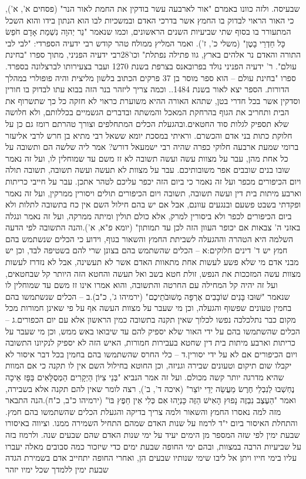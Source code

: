 \documentclass[12pt, openany]{book}
\begin{document}
שבעיסה. ולזה כוונו באמרם "אור לארבעה עשר בודקין את החמת לאור הנר" (פסחים א', א'), כי האור הראוי לבדוק בו החמץ אשר בדרכי האדם ובמשכיות לבו הוא הנתון בידו והוא השכל המתעורר בו בסוף שתי שביעיות השנים הראשונים, וכמו שנאמר "נֵר יְהוָה נִשְׁמַת אָדָם חֹפֵשׂ כָּל חַדְרֵי בָטֶן" (משלי כ', ז'). ואמר המליץ ממולח טהר קודש רבי ידעיה הספרדי: "לבי לבי  התורה והאדם נר אלהים בארץ, גוו פתילה נפתלת" וכו'28רבי ידעיה הפניני, מתוך ספרו "בחינת עולם". ר' ידעיה הפניני נולד בפרובאנס בצרפת בשנת 1270 ועבר בצעירותו לברצלונה בספרד. ספרו "בחינת עולם – הוא ספר מוסר בן 37 פרקים הכתוב בלשון מליצית והיה פופולרי במהלך הדורות. הספר יצא לאור בשנת 1484.. וכמה צריך ליזהר בנר הזה בבוא עתו לבדוק בו חורין וסדקין אשר בכל חדרי בטן, שתהא האורה ההיא משוערת כראוי לא חזקה כל כך שתשרוף את הבית ותחריב את הגוף בהרחקת המאכל והמשתה ובדברים הגשמיים בכללותם, ולא חלושה שלא תספיק לגלות סוד החטאים.ובהגעלת הכלים המתחלפים וצורך טהרתם רומז גם כן  על חלוקת כתות בני אדם והכשרם. וראיתי במסכת יומא ששאל רבי מתיא בן חרש לרבי אליעזר ברומי שמעת ארבעה חלוקי כפרה שהיה רבי ישמעאל דורש? אמר ליה שלשה הם ותשובה על כל אחת מהן, עבר על מצוות עשה ועשה תשובה לא זז משם עד שמוחלין לו, ועל זה נאמר שובו בנים שובבים אפר משובותיכם. עבר על מצוות לא תעשה ועשה תשובה, תשובה תולה ויום הכיפורים מכפר ועל זה נאמר כי ביום הזה יכפר עליכם לטהר אתכן. עבר על חייבי כריתות וארבע מיתות בית דין ועשה תשובה, תשובה ויום הכיפורים תולים ויסורין ממרקין, ועל זה נאמר ופקדתי בשבט פשעם ובנגעים עוונם, אבל אם יש בהם חילול השם אין כח בתשובה לתלות ולא ביום הכיפורים לכפר ולא ביסורין למרק, אלא כולם תולין ומיתה ממרקה, ועל זה נאמר ונגלה באזני ה' צבאות אם יכופר העוון הזה לכן עד תמותון" (יומא פ"א, א').והנה התשובה לפי הדעה השלמה היא הטהרה וההגעלה לשביתת החמץ והשאור בגוף, וידוע כי הכלים שנשתמש בהם חמץ יש ד' דינים חלוקים:א – הכלים שהשתמש בהם בצונן שרי להם בשטיפה לבד, וכן יש מבני אדם מי שלא פשע לעשות אחת מתאוות האדם אשר לא תעשינה, אבל לא נזדרז לעשות מצוות עשה המזככות את הנפש, זולת חטא בשב ואל תעשה והחטא הזה היותר קל שבחטאים, ועל זה יהיה קל המחילה עם החרטה והתשובה, והוא אמרו אינו זז משם עד שמוחלין לו שנאמר "שׁוּבוּ בָּנִים שׁוֹבָבִים אֶרְפָּה מְשׁוּבֹתֵיכֶם" (ירמיהו ג', כ"ב).ב – הכלים שנשתמשו בהם בחמין טעונים שפשוף והגעלה, וכן מי שעבר על מצוות העשה אף על פי שאינן חמורות מכל מקום כבר נתלכלכה נפשו לכלוך שאין תקנה בתשובה כמין הראשון אלא עם יום הכפורים.ג – הכלים שהשתמשו בהם על ידי האור שלא יספיק להם עד שיבואו באש ממש, וכן מי שעבר על כריתות וארבע מיתות בית דין שחטא בעבירות חמורות, האיש הזה לא יספיק לנקיונו התשובה ויום הכיפורים אם לא על ידי יסורין.ד – כלי החרס שהשתמשו בהם בחמין בכל דבר איסור לא יקבלו שום תיקום וטעונים שבירה וגניזה, וכן החוטא בחילול השם אין לו תקנה כי אם המוות שהיא מדרגה יותר קשה מכולם. ועל זה אמר הנביא "בְּנֵי צִיּוֹן הַיְקָרִים הַמְסֻלָּאִים בַּפָּז אֵיכָה נֶחְשְׁבוּ לְנִבְלֵי חֶרֶשׂ מַעֲשֵׂה יְדֵי יוֹצֵר" (איכה ד', ב'), רצה לומר שאין להם תקנה אלא בשבירה, ואמר "הַעֶצֶב נִבְזֶה נָפוּץ הָאִישׁ הַזֶּה כָּנְיָהוּ אִם כְּלִי אֵין חֵפֶץ בּוֹ" (ירמיהו כ"ב, כ"ח).הנה התבאר מזה למה נאסרו החמץ והשאור ולמה צריך בדיקה והגעלת הכלים שהשתמשו בהם חמץ. והתחלת האיסור ביום י"ד לרמוז על שנות האדם שמהם התחיל השמירה ממנו. וציווה באיסורו שבעת ימין לפי שזה המספר מן הימים יעיד על ימי שנות האדם שהם שבעים שנה. ולרמוז בזה על שביעיות הרבה במצוות, ובהם ימי החופה שבעת ימים כדי שיזכור כמה סבובים מאלה יעברו עליו בימי חייו ויתן אל ליבו שימי שנותיו שבעים הן, ואחרי החופה יתחייב אדם בשמירת הגדה שבעת ימין ללמדך שכל ימיו יזהר 
\end{document}
